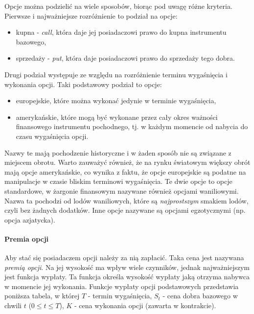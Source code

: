 \documentclass[]{pwr_wmat_praca_dyplomowa}
\theoremstyle{plain}
\numberwithin{theorem}{chapter}
\theoremstyle{definition}
\numberwithin{theorem}{chapter}
\begin{document}
Opcje można podzielić na wiele sposobów, biorąc pod uwagę różne kryteria. Pierwsze i najważniejsze rozróżnienie to podział na opcje:
\begin{itemize}
\item kupna - \textit{call}, która daje jej posiadaczowi prawo do kupna instrumentu bazowego,
\item sprzedaży - \textit{put}, która daje posiadaczowi prawo do sprzedaży tego dobra.
\end{itemize}

\noindent Drugi podział występuje ze względu na rozróżnienie terminu wygaśnięcia i wykonania opcji. Taki podstawowy podział to opcje:
\begin{itemize}
\item europejskie, które można wykonać jedynie w terminie wygaśnięcia,
\item amerykańskie, które mogą być wykonane przez cały okres ważności finansowego instrumentu pochodnego, tj. w każdym momencie od nabycia do czasu wygaśnięcia opcji.
\end{itemize}
Nazwy te mają pochodzenie historyczne i w żaden sposób nie są związane z miejscem obrotu. Warto zauważyć również, że na rynku światowym większy obrót mają opcje amerykańskie, co wynika z faktu, że opcje europejskie są podatne na manipulacje w czasie bliskim terminowi wygaśnięcia. Te dwie opcje to opcje standardowe, w żargonie finansowym nazywane również opcjami waniliowymi. Nazwa ta pochodzi od lodów waniliowych, które są \textit{najprostszym} smakiem lodów, czyli bez żadnych dodatków. Inne opcje nazywane są opcjami egzotycznymi (np. opcja azjatycka).

\paragraph{Premia opcji} Aby stać się posiadaczem opcji należy za nią zapłacić. Taka cena jest nazywana \textit{premią opcji}. Na jej wysokość ma wpływ wiele czynników, jednak najważniejszym jest funkcja wypłaty. Ta funkcja określa wysokość wypłaty jaką otrzyma nabywca w momencie jej wykonania. Funkcje wypłaty opcji podstawowych przedstawia poniższa tabela, w której $T$ - termin wygaśnięcia, $S_t$ - cena dobra bazowego w chwili $t$ ($0 \leq t \leq T$), $K$ - cena wykonania opcji (zawarta w kontrakcie).
\end{document}
